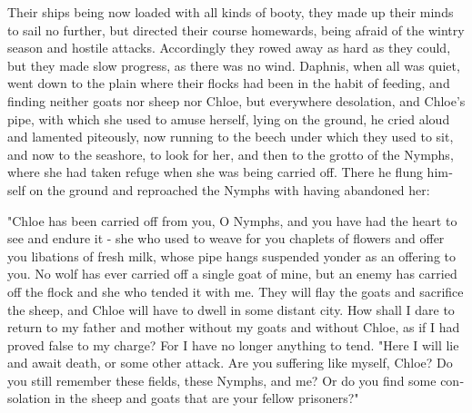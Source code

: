 \documentclass{book}
\begin{document}
\begin{pairs}
\begin{Rightside}
\begin{english}
  Their ships being now loaded with all kinds of booty, they made up their minds to sail no further, but directed their course homewards, being afraid of the wintry season and hostile attacks.  Accordingly they rowed away as hard as they could, but they made slow progress, as there was no wind.  Daphnis, when all was quiet, went down to the plain where their flocks had been in the habit of feeding, and finding neither goats nor sheep nor Chloe, but everywhere desolation, and Chloe's pipe, with which she used to amuse herself, lying on the ground, he cried aloud and lamented piteously, now running to the beech under which they used to sit, and now to the seashore, to look for her, and then to the grotto of the Nymphs, where she had taken refuge when she was being carried off.  There he flung himself on the ground and reproached the Nymphs with having abandoned her:
\pend


  "Chloe has been carried off from you, O Nymphs, and you have had the heart to see and endure it - she who used to weave for you chaplets of flowers and offer you libations of fresh milk, whose pipe hangs suspended yonder as an offering to you.  No wolf has ever carried off a single goat of mine, but an enemy has carried off the flock and she who tended it with me.  They will flay the goats and sacrifice the sheep, and Chloe will have to dwell in some distant city.  How shall I dare to return to my father and mother without my goats and without Chloe, as if I had proved false to my charge?  For I have no longer anything to tend.  "Here I will lie and await death, or some other attack.  Are you suffering like myself, Chloe?  Do you still remember these fields, these Nymphs, and me?  Or do you find some consolation in the sheep and goats that are your fellow prisoners?"
\pend



\end{english}
\end{Rightside}
\end{pairs}
\end{document}

